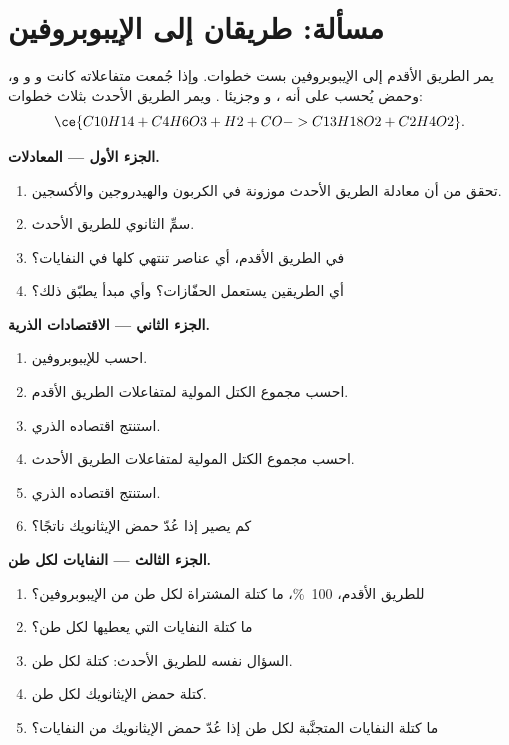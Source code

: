 \section{مسألة: طريقان إلى الإيبوبروفين}

\begin{problem}
\label{pb:g12:synthesis-strategy:1}
يمر الطريق الأقدم إلى الإيبوبروفين  بست خطوات. وإذا
جُمعت متفاعلاته كانت  و
و و، وحمض يُحسب على أنه ،
و وجزيئا . ويمر الطريق الأحدث بثلاث خطوات:
\[
  \ce{C10H14 + C4H6O3 + H2 + CO -> C13H18O2 + C2H4O2} .
\]

\medskip
\noindent\textbf{الجزء الأول --- المعادلات.}
\begin{enumerate}
  \item تحقق من أن معادلة الطريق الأحدث موزونة في الكربون
        والهيدروجين والأكسجين.
  \item سمِّ  الثانوي للطريق الأحدث.
  \item في الطريق الأقدم، أي عناصر  تنتهي
        كلها في النفايات؟
  \item أي الطريقين يستعمل الحفّازات؟ وأي مبدأ يطبّق
        ذلك؟
\end{enumerate}

\medskip
\noindent\textbf{الجزء الثاني --- الاقتصادات الذرية.}
\begin{enumerate}[resume]
  \item احسب  للإيبوبروفين.
  \item احسب مجموع الكتل المولية لمتفاعلات الطريق
        الأقدم.
  \item استنتج اقتصاده الذري.
  \item احسب مجموع الكتل المولية لمتفاعلات الطريق
        الأحدث.
  \item استنتج اقتصاده الذري.
  \item كم يصير إذا عُدّ حمض الإيثانويك
        ناتجًا؟
\end{enumerate}

\medskip
\noindent\textbf{الجزء الثالث --- النفايات لكل طن.}
\begin{enumerate}[resume]
  \item للطريق الأقدم،  \qty{100}{\percent}، ما كتلة
         المشتراة لكل طن من الإيبوبروفين؟
  \item ما كتلة النفايات التي يعطيها لكل طن؟
  \item السؤال نفسه للطريق الأحدث: كتلة  لكل طن.
  \item كتلة حمض الإيثانويك لكل طن.
  \item ما كتلة النفايات المتجنَّبة لكل طن إذا عُدّ حمض الإيثانويك
        من النفايات؟
\end{enumerate}


\end{problem}
